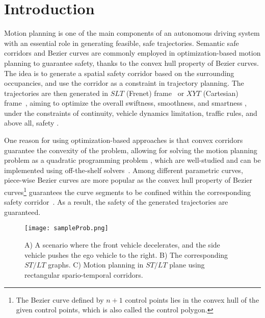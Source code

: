 \section{Introduction}

Motion planning is one of the main components of an autonomous driving system with an essential role in generating feasible, safe trajectories. Semantic safe corridors and Bezier curves are commonly employed in optimization-based motion planning to guarantee safety, thanks to the convex hull property of Bezier curves. The idea is to generate a spatial safety corridor based on the surrounding occupancies, and use the corridor as a constraint in trajectory planning. The trajectories are then generated in $SLT$ (Frenet) frame~\cite{fan2018baidu} or $XYT$ (Cartesian) frame~\cite{sun2018fast}, aiming to optimize the overall swiftness, smoothness, and smartness \cite{fleury1995primitives}, 
under the constraints of continuity, vehicle dynamics limitation, traffic rules, and above all, safety \cite{lu2020adaptive}.  

One reason for using optimization-based approaches is that convex corridors
guarantee the convexity of the problem, allowing for solving the motion planning problem as a quadratic programming problem \cite{xu2014motion}, which are well-studied and can be implemented using off-the-shelf solvers~\cite{qian2016optimal}. Among different parametric curves, piece-wise Bezier curves are more popular as the convex hull property of Bezier curves\footnote{The Bezier curve defined by $n+1$ control points lies in the convex hull of the given control points, which is also called the control polygon.} \cite{aziz1990bezier} guarantees the curve segments to be confined within the corresponding 
safety corridor~\cite{gao2018online}. As a result, the safety of the generated trajectories are guaranteed. 

\begin{figure}[tbp]
\begin{center}
\texttt{[image: sampleProb.png]}
\end{center}
\vspace{-0.2 in}
\caption{A) A scenario where the front vehicle decelerates, and the side vehicle pushes the ego vehicle to the right. B) The corresponding $ST/LT$ graphs. C) Motion planning in $ST/LT$ plane using rectangular spario-temporal corridors.}
\label{Fig:sampleProb}
\vspace{-0.2 in}
\end{figure}

